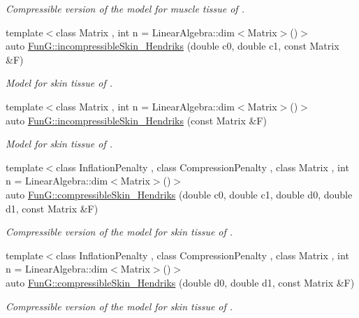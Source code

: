\begin{DoxyCompactItemize}
\begin{DoxyCompactList}\small\item\em Compressible version of the model for muscle tissue of \cite{Martins1998}. \end{DoxyCompactList}\item 
{\footnotesize template$<$class Matrix , int n = Linear\+Algebra\+::dim$<$\+Matrix$>$()$>$ }\\auto \hyperlink{group__Biomechanics_gaa20bf15ef6976d64d89490429035b2c4}{Fun\+G\+::incompressible\+Skin\+\_\+\+Hendriks} (double c0, double c1, const Matrix \&F)
\begin{DoxyCompactList}\small\item\em Model for skin tissue of \cite{Hendriks2005}. \end{DoxyCompactList}\item 
{\footnotesize template$<$class Matrix , int n = Linear\+Algebra\+::dim$<$\+Matrix$>$()$>$ }\\auto \hyperlink{group__Biomechanics_gad8653218bd2afb4e3cfd601a5142956c}{Fun\+G\+::incompressible\+Skin\+\_\+\+Hendriks} (const Matrix \&F)
\begin{DoxyCompactList}\small\item\em Model for skin tissue of \cite{Hendriks2005}. \end{DoxyCompactList}\item 
{\footnotesize template$<$class Inflation\+Penalty , class Compression\+Penalty , class Matrix , int n = Linear\+Algebra\+::dim$<$\+Matrix$>$()$>$ }\\auto \hyperlink{group__Biomechanics_ga07b4c52c6ecf7e72f73ab5832fb262cd}{Fun\+G\+::compressible\+Skin\+\_\+\+Hendriks} (double c0, double c1, double d0, double d1, const Matrix \&F)
\begin{DoxyCompactList}\small\item\em Compressible version of the model for skin tissue of \cite{Hendriks2005}. \end{DoxyCompactList}\item 
{\footnotesize template$<$class Inflation\+Penalty , class Compression\+Penalty , class Matrix , int n = Linear\+Algebra\+::dim$<$\+Matrix$>$()$>$ }\\auto \hyperlink{group__Biomechanics_ga42721e772b7eada1b0bca98247ad440f}{Fun\+G\+::compressible\+Skin\+\_\+\+Hendriks} (double d0, double d1, const Matrix \&F)
\begin{DoxyCompactList}\small\item\em Compressible version of the model for skin tissue of \cite{Hendriks2005}. \end{DoxyCompactList}\end{DoxyCompactItemize}


